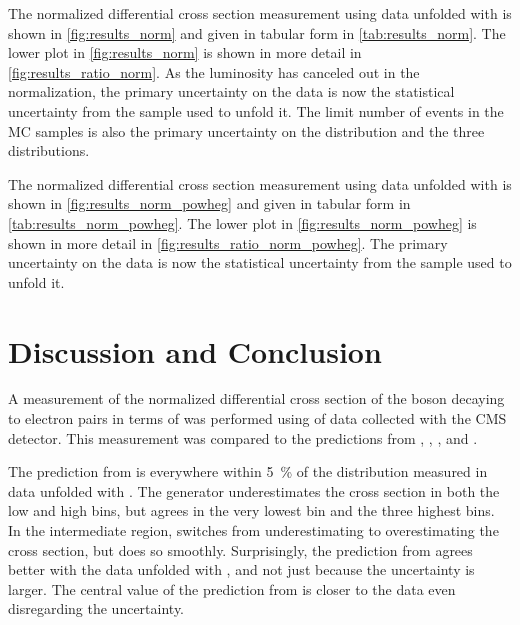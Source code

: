 The normalized differential cross section measurement using data unfolded with
\MADGRAPH is shown in \cref{fig:results_norm} and given in tabular form in
\cref{tab:results_norm}. The lower plot in \cref{fig:results_norm} is
shown in more detail in \cref{fig:results_ratio_norm}. As the luminosity
has canceled out in the normalization, the primary uncertainty on the data is
now the statistical uncertainty from the \MADGRAPH sample used to unfold it.
The limit number of events in the MC samples is also the primary uncertainty on
the \MADGRAPH distribution and the three \POWHEG distributions.




The normalized differential cross section measurement using data unfolded with
\PPsixZtwo is shown in \cref{fig:results_norm_powheg} and given in tabular form
in \cref{tab:results_norm_powheg}. The lower plot in
\cref{fig:results_norm_powheg} is shown in more detail in
\cref{fig:results_ratio_norm_powheg}. The primary uncertainty on the data is
now the statistical uncertainty from the \POWHEG sample used to unfold it.




\clearpage
\section{Discussion and Conclusion}
\label{sec:discussion}

A measurement of the normalized differential cross section of the \Z boson
decaying to electron pairs in terms of \phistar was performed using
\GoodLumiNumber of \rootseight data collected with the CMS detector. This
measurement was compared to the predictions from \MGsixZtwo, \PPsixZtwo,
\PPeightTTfive, and \PPeightTTfourteen.

The prediction from \MADGRAPH is everywhere within \SI{5}{\percent} of the
distribution measured in data unfolded with \MADGRAPH. The generator
underestimates the cross section in both the low and high \phistar bins, but
agrees in the very lowest bin and the three highest bins. In the intermediate
region, \MADGRAPH switches from underestimating to overestimating the cross
section, but does so smoothly. Surprisingly, the prediction from \MADGRAPH
agrees better with the data unfolded with \PPsixZtwo, and not just because the
uncertainty is larger. The central value of the prediction from \MADGRAPH is
closer to the data even disregarding the uncertainty.

